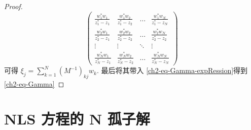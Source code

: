 \begin{proof}
\begin{equation}
\begin{pmatrix}
            \frac{w_{1}^{*}w_{1}}{z_{1}^{*} - z_{1}} & \frac{w_{1}^{*}w_{2}}{z_{1}^{*} - z_{2}} & \dots  & \frac{w_{1}^{*}w_{N}}{z_{1}^{*} - z_{N}} \\
            \frac{w_{2}^{*}w_{1}}{z_{2}^{*} - z_{1}} & \frac{w_{2}^{*}w_{2}}{z_{2}^{*} - z_{2}} & \dots  & \frac{w_{2}^{*}w_{N}}{z_{2}^{*} - z_{2}} \\
            \vdots                                   & \vdots                                   & \ddots & \vdots                                   \\
            \frac{w_{N}^{*}w_{1}}{z_{N}^{*} - z_{1}} & \frac{w_{N}^{*}w_{2}}{z_{N}^{*} - z_{2}} & \dots  & \frac{w_{N}^{*}w_{N}}{z_{N}^{*} - z_{N}}
        \end{pmatrix}
    \end{equation}
    可得 $ \xi_{j} = \sum_{k =1}^{N}(M^{-1})_{kj} w_{k} $. 最后将其带入 \eqref{ch2-eq-Gamma-expRession}得到 \eqref{ch2-eq-Gamma}
\end{proof}

\section{NLS 方程的 N 孤子解}
